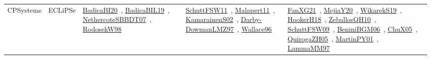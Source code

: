 {\begin{longtable}{lp{3cm}>{\raggedright\arraybackslash}p{6cm}>{\raggedright\arraybackslash}p{6cm}>{\raggedright\arraybackslash}p{8cm}}
CPSystems & ECLiPSe & \href{works/BadicaBI20.pdf}{BadicaBI20}~\cite{BadicaBI20}, \href{works/BadicaBIL19.pdf}{BadicaBIL19}~\cite{BadicaBIL19}, \href{works/NethercoteSBBDT07.pdf}{NethercoteSBBDT07}~\cite{NethercoteSBBDT07}, \href{works/RodosekW98.pdf}{RodosekW98}~\cite{RodosekW98} & \href{works/SchuttFSW11.pdf}{SchuttFSW11}~\cite{SchuttFSW11}, \href{works/Malapert11.pdf}{Malapert11}~\cite{Malapert11}, \href{works/KamarainenS02.pdf}{KamarainenS02}~\cite{KamarainenS02}, \href{works/Darby-DowmanLMZ97.pdf}{Darby-DowmanLMZ97}~\cite{Darby-DowmanLMZ97}, \href{works/Wallace96.pdf}{Wallace96}~\cite{Wallace96} & \href{works/FanXG21.pdf}{FanXG21}~\cite{FanXG21}, \href{works/MejiaY20.pdf}{MejiaY20}~\cite{MejiaY20}, \href{works/WikarekS19.pdf}{WikarekS19}~\cite{WikarekS19}, \href{works/HookerH18.pdf}{HookerH18}~\cite{HookerH18}, \href{works/ZeballosQH10.pdf}{ZeballosQH10}~\cite{ZeballosQH10}, \href{works/SchuttFSW09.pdf}{SchuttFSW09}~\cite{SchuttFSW09}, \href{works/BeniniBGM06.pdf}{BeniniBGM06}~\cite{BeniniBGM06}, \href{works/ChuX05.pdf}{ChuX05}~\cite{ChuX05}, \href{works/QuirogaZH05.pdf}{QuirogaZH05}~\cite{QuirogaZH05}, \href{works/MartinPY01.pdf}{MartinPY01}~\cite{MartinPY01}, \href{works/LammaMM97.pdf}{LammaMM97}~\cite{LammaMM97}\\

\end{longtable}}
